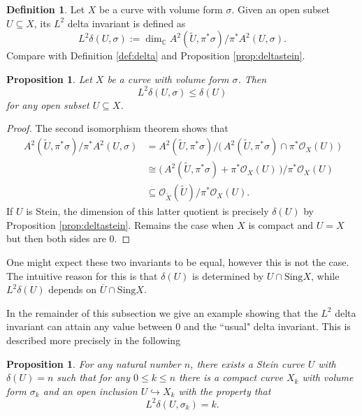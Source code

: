 \documentclass[11pt]{amsart}
\newtheorem{prop}[theorem]{Proposition}
\theoremstyle{definition}
\newtheorem{definition}[theorem]{Definition}
\newcommand{\bC}{{\mathbb C}}
\begin{document}
    \begin{definition}
        Let $X$ be a curve with volume form $\sigma$. Given an open subset $U \subseteq X$, its $L^2$ delta invariant is defined as
        $$L^2\delta(U,\sigma) := \dim_\bC A^2(\widetilde{U},\pi^*\sigma ) \big/ \pi^* A^2(U,\sigma).$$
        Compare with Definition \ref{def:delta} and Proposition \ref{prop:deltastein}.
    \end{definition}

    \begin{prop}\label{prop:l2deltaleqdelta}
        Let $X$ be a curve with volume form $\sigma$. Then $$L^2\delta(U,\sigma) \leq \delta(U)$$ for any open subset $U \subseteq X$.
    \end{prop}

    \begin{proof}
        The second isomorphism theorem shows that
        \begin{align*}                  
            A^2(\widetilde{U},\pi^*\sigma)\big/\pi^*A^2(U,\sigma) &= A^2(\widetilde{U},\pi^*\sigma)\big/\big(\,A^2(\widetilde{U},\pi^*\sigma)\cap \pi^*\mathcal{O}_X(U)\,\big) \\
            &\cong \big( \, A^2(\widetilde{U},\pi^*\sigma) + \pi^*\mathcal{O}_X(U) \,) \big/ \pi^*\mathcal{O}_X(U) \\
            &\subseteq \mathcal{O}_{\widetilde{X}}(\widetilde{U}) \big/ \pi^*\mathcal{O}_X(U).
        \end{align*}
        If $U$ is Stein, the dimension of this latter quotient is precisely $\delta(U)$ by Proposition \ref{prop:deltastein}. Remains the case when $X$ is compact and $U=X$ but then both sides are $0$.
    \end{proof}

\noindent One might expect these two invariants to be equal, however this is not the case. The intuitive reason for this is that $\delta(U)$ is determined by $U \cap \text{Sing}X$, while $L^2\delta(U)$ depends on $\overline{U} \cap \text{Sing}X$. 

In the remainder of this subsection we give an example showing that the $L^2$ delta invariant can attain any value between $0$ and the ``usual" delta invariant. This is described more precisely in the following

\begin{prop}
    For any natural number $n$, there exists a Stein curve $U$ with $\delta(U) = n$ such that for any $0 \leq k \leq n$ there is a compact curve $X_k$ with volume form $\sigma_k$ and an open inclusion $U \hookrightarrow X_k$ with the property that
    $$L^2\delta(U,\sigma_k) = k.$$
\end{prop}
\end{document}
